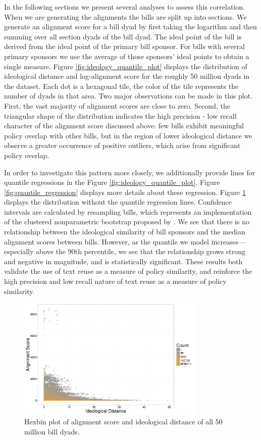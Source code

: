 \documentclass[12pt]{article} %
\begin{document}
In the following sections we present several analyses to assess this correlation. When we are generating the alignments the bills are split up into sections. We generate an alignment score for a bill dyad by first taking the logarithm and then summing over all section dyads of the bill dyad. The ideal point of the bill is derived from the ideal point of the primary bill sponsor. For bills with several primary sponsors we use the average of those sponsors' ideal points to obtain a single measure. Figure \ref{fig:ideology_quantile_plot} displays the distribution of ideological distance and log-alignment score for the roughly 50 million dyads in the dataset. Each dot is a hexagonal tile, the color of the tile represents the number of dyads in that area. Two major observations can be made in this plot. First, the vast majority of alignment scores are close to zero. Second, the triangular shape of the distribution indicates the high precision - low recall character of the alignment score discussed above: few bills exhibit meaningful policy overlap with other bills, but in the region of lower ideological distance we observe a greater occurrence of positive outliers, which arise from significant policy overlap. 

In order to investigate this pattern more closely, we additionally provide lines for quantile regressions in the Figure \ref{fig:ideology_quantile_plot}. Figure \ref{fig:quantile_regression} displays more details about these regression. Figure \ref{fig:ideology_plot} displays the distribution without the quantile regression lines. Confidence intervals are calculated by resampling bills, which represents an implementation of the clustered nonparametric bootstrap proposed by \citet{harden2011bootstrap}. We see that there is no relationship between the ideological similarity of bill sponsors and the median alignment scores between bills. However, as the quantile we model increases---especially above the 90th percentile, we see that the relationship grows strong and negative in magnitude, and is statistically significant. These results both validate the use of text reuse as a measure of policy similarity, and reinforce the high precision and low recall nature of text reuse as a measure of policy similarity.


\begin{figure}[ht!]
    \centering
    \includegraphics[width=0.8\textwidth]{figures/ideology_plot.png}
    \caption{Hexbin plot of alignment score and ideological distance of all 50 million bill dyads.}
    \label{fig:ideology_plot}
\end{figure}
\end{document}
